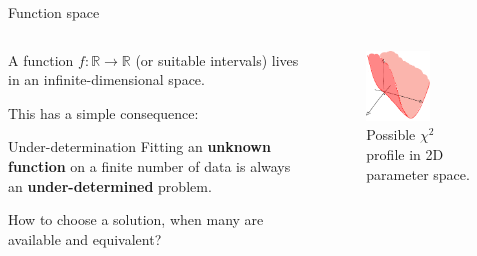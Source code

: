 \documentclass[9pt]{beamer}
\begin{document}
\begin{frame}{Function space}
    \begin{columns}
        \begin{column}{0.5\textwidth}
            A function $f: \mathbb{R} \to \mathbb{R}$ (or suitable intervals)
            lives in an infinite-dimensional space.
            \vspace*{20pt}

            This has a simple consequence:
            \begin{block}{Under-determination}
                Fitting an \textbf{unknown function} on a finite number of data
                is always an \textbf{under-determined} problem.
            \end{block}
            \vspace*{20pt}

            How to choose a solution, when \alert{many} are available and
            \alert{equivalent}?
        \end{column}
        \begin{column}{0.5\textwidth}
            \begin{figure}
                \centering
                \includegraphics[width=0.6\textwidth]{underdetermined}
                \caption{Possible $\chi^2$ profile in 2D parameter space.}
            \end{figure}
        \end{column}
    \end{columns}
\end{frame}
\end{document}
